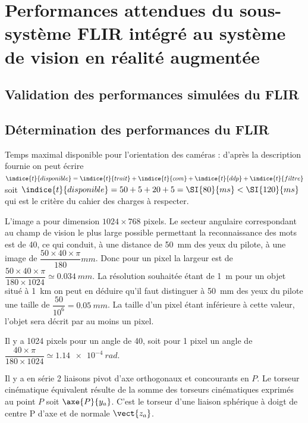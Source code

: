 
\section{Performances attendues du sous-système FLIR intégré au système
de vision en réalité augmentée}
\subsection{Validation des performances simulées du FLIR}
\subsection{Détermination des performances du FLIR}


\question{}
\ifprof
\begin{corrige}
Temps maximal disponible pour l'orientation des caméras : d'après la description fournie on peut écrire
$\indice{t}{disponible} = \indice{t}{trait}+ \indice{t}{com}+ \indice{t}{ddp}+ \indice{t}{filtre}$
 soit
 $\indice{t}{disponible} = 50+5+20+5=\SI{80}{ms}<\SI{120}{ms}$ 
 qui est le critère du cahier des charges à respecter.
\end{corrige}
\else
\fi

\question{}
\ifprof
\begin{corrige}
L'image a pour dimension $1024 \times 768$ pixels. Le secteur angulaire correspondant au champ de vision le plus large possible permettant la reconnaissance des mots est de 40\degres, ce qui conduit, à une distance de \SI{50}{mm} des yeux du pilote, à une image de
$\dfrac{50\times 40 \times \pi}{180} \si{mm}$. 
Donc pour un pixel la largeur est de  
$\dfrac{50\times 40 \times \pi}{180\times 1024}  \simeq \SI{0,034}{mm}$. 
La résolution souhaitée étant de \SI{1}{m} pour un objet situé à \SI{1}{km} on peut en déduire qu'il faut distinguer à \SI{50}{mm} des yeux du pilote une taille de
$\dfrac{50}{10^6}=\SI{0,05}{mm}$. La taille d'un pixel étant inférieure à cette valeur, l'objet sera décrit par au moins un pixel.
\end{corrige}
\else
\fi

\question{}
\ifprof
\begin{corrige}
Il y a 1024 pixels pour un angle de 40\degres, soit pour 1 pixel un angle de 
$\dfrac{40 \times \pi}{180\times 1024} \simeq \SI{1,14e-4}{rad}$. 
\end{corrige}
\else
\fi

\question{}
\ifprof
\begin{corrige}
Il y a en série 2 liaisons pivot d'axe orthogonaux et concourants en $P$. Le torseur cinématique équivalent résulte de la somme des torseurs cinématiques exprimés au point $P$ soit $\axe{P}{y_a}$. C'est le torseur d'une liaison sphérique à doigt de centre P d'axe et de normale $\vect{z_a}$.
\end{corrige}
\else
\fi


